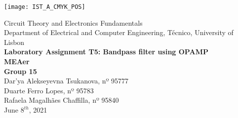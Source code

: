 
\thispagestyle {empty}

\texttt{[image: IST\_A\_CMYK\_POS]}

\begin{center}
%
\vspace{1.0cm}

\vspace{1cm}
{\FontLb Circuit Theory and Electronics Fundamentals} \\ %
\vspace{1cm}
{\FontSn Department of Electrical and Computer Engineering, Técnico, University of Lisbon} \\ %
\vspace{1cm}
{\FontSn \textbf{Laboratory Assignment T5: Bandpass filter using OPAMP}} \\
\vspace{1cm}
{\FontSn \textbf{MEAer}} \\ %
\vspace{1cm}
{\FontSn \textbf{Group 15}} \\
\vspace{.5cm}
{\FontSn Dar'ya Alekseyevna Tsukanova, nº 95777} \\
{\FontSn Duarte Ferro Lopes, nº 95783} \\
{\FontSn Rafaela Magalhães Chaffilla, nº 95840} \\
\vspace{1cm}
{\FontSn June $8^{th}$, 2021} \\ %
%
\end{center}


